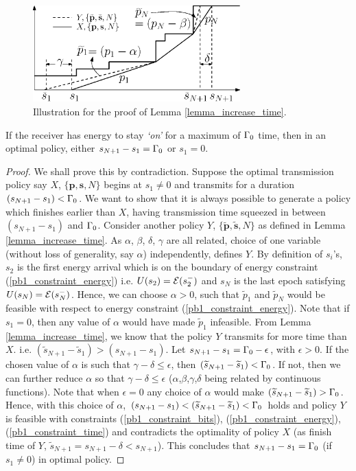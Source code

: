 \begin{figure}
\centering
  \centerline{\includegraphics[width=8cm]{Lemma4.eps}}
\caption{Illustration for the proof of Lemma \ref{lemma_increase_time}.}\label{lemma4}
\end{figure}

\begin{lemma}
If the receiver has energy to stay \textit{`on'} for a maximum of $\Gamma_0$ time, then in an optimal policy, either $s_{N+1} - s_1 = \Gamma_0$ or $s_1 = 0$. 
\label{transmission_duration}
\end{lemma}
\begin{proof}
We shall prove this by contradiction. Suppose the optimal transmission policy say $X$, $\{\bm{p},\bm{s},N\}$ begins at $s_1\neq 0$ and transmits for a duration $(s_{N+1}-s_1)< \Gamma_0$. We want to show that it is always possible to generate a policy which finishes earlier than $X$, having transmission time squeezed in between $(s_{N+1}-s_1)$ and $\Gamma_0$. Consider another policy $Y$, $\{\bm{\widetilde{p}},\bm{\widetilde{s}},N\}$ as defined in Lemma \ref{lemma_increase_time}. As $\alpha$, $\beta$, $\delta$, $\gamma$ are all related, choice of one variable (without loss of generality, say $\alpha$) independently, defines $Y$. By definition of $s_i$'s, $s_{2}$ is the first energy arrival which is on the boundary of energy constraint (\ref{pb1_constraint_energy}) i.e. $U(s_2)=\mathcal{E}(s_2^-)$ and $s_{N}$ is the last epoch satisfying $U(s_N)=\mathcal{E}(s_N^-)$. Hence, we can choose $\alpha>0$, such that $\tilde{p}_1$ and $\tilde{p}_N$ would be feasible with respect to energy constraint (\ref{pb1_constraint_energy}). Note that if $s_1=0$, then any value of $\alpha$ would have made $\widetilde{p}_1$ infeasible. From Lemma \ref{lemma_increase_time}, we know that the policy $Y$ transmits for more time than $X$. i.e. $(\tilde{s}_{N+1}-\tilde{s}_1) > (s_{N+1} - s_{1})$. Let $s_{N+1}-s_1=\Gamma_0-\epsilon$, with $\epsilon >0$. If the chosen value of $\alpha$ is such that $\gamma -\delta\le\epsilon$, then $\left( \widetilde{s}_{N+1}-\widetilde{s}_1\right)<\Gamma_0$. If not, then we can further reduce $\alpha$ so that $\gamma -\delta\le\epsilon$ ($\alpha$,$\beta$,$\gamma$,$\delta$ being related by continuous functions).  Note that when $\epsilon=0$ any choice of $\alpha$ would make $\left( \widetilde{s}_{N+1}-\widetilde{s}_1\right)>\Gamma_0$. Hence, with this choice of $\alpha$, $(s_{N+1}-s_1)<\left( \widetilde{s}_{N+1}-\widetilde{s}_1\right)<\Gamma_0$ holds and  policy $Y$ is feasible with constraints  (\ref{pb1_constraint_bits}), (\ref{pb1_constraint_energy}), (\ref{pb1_constraint_time}) and contradicts the optimality of policy $X$ (as finish time of $Y$, $\widetilde{s}_{N+1}=s_{N+1}-\delta <s_{N+1}$). This concludes that $s_{N+1}-s_1=\Gamma_0$ (if $s_1\neq 0$) in optimal policy.
\end{proof}